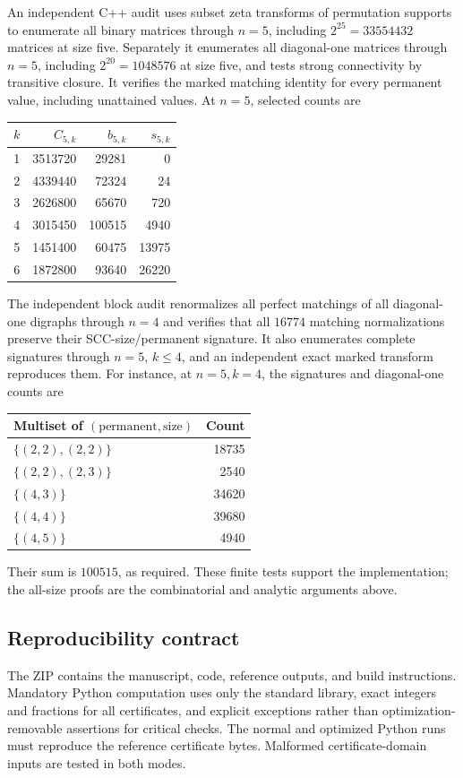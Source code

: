 \documentclass[11pt]{article}
\theoremstyle{definition}\newtheorem{definition}[theorem]{Definition}
\theoremstyle{remark}\newtheorem{remark}[theorem]{Remark}
\begin{document}
An independent C++ audit uses subset zeta transforms of permutation supports to enumerate all binary matrices through $n=5$, including $2^{25}=33554432$ matrices at size five. Separately it enumerates all diagonal-one matrices through $n=5$, including $2^{20}=1048576$ at size five, and tests strong connectivity by transitive closure. It verifies the marked matching identity for every permanent value, including unattained values. At $n=5$, selected counts are
\begin{center}
\begin{tabular}{c r r r}
\toprule
$k$ & $C_{5,k}$ & $b_{5,k}$ & $s_{5,k}$\\
\midrule
1&3513720&29281&0\\
2&4339440&72324&24\\
3&2626800&65670&720\\
4&3015450&100515&4940\\
5&1451400&60475&13975\\
6&1872800&93640&26220\\
\bottomrule
\end{tabular}
\end{center}

The independent block audit renormalizes all perfect matchings of all diagonal-one digraphs through $n=4$ and verifies that all $16774$ matching normalizations preserve their SCC-size/permanent signature. It also enumerates complete signatures through $n=5$, $k\le4$, and an independent exact marked transform reproduces them. For instance, at $n=5,k=4$, the signatures and diagonal-one counts are
\begin{center}
\begin{tabular}{l r}
\toprule
Multiset of $(\text{permanent},\text{size})$ & Count\\
\midrule
$\{(2,2),(2,2)\}$&18735\\
$\{(2,2),(2,3)\}$&2540\\
$\{(4,3)\}$&34620\\
$\{(4,4)\}$&39680\\
$\{(4,5)\}$&4940\\
\bottomrule
\end{tabular}
\end{center}
Their sum is $100515$, as required. These finite tests support the implementation; the all-size proofs are the combinatorial and analytic arguments above.

\subsection{Reproducibility contract}
The ZIP contains the manuscript, code, reference outputs, and build instructions. Mandatory Python computation uses only the standard library, exact integers and fractions for all certificates, and explicit exceptions rather than optimization-removable assertions for critical checks. The normal and optimized Python runs must reproduce the reference certificate bytes. Malformed certificate-domain inputs are tested in both modes.
\end{document}
